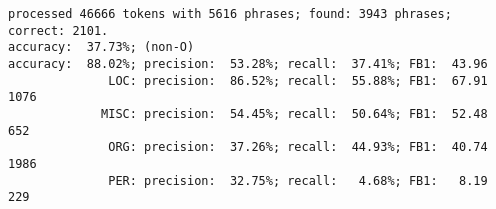 \documentclass[10pt]{article}
\begin{document}
\begingroup
    \fontsize{8pt}{12pt}\selectfont
    \begin{verbatim}  
processed 46666 tokens with 5616 phrases; found: 3943 phrases; correct: 2101.
accuracy:  37.73%; (non-O)
accuracy:  88.02%; precision:  53.28%; recall:  37.41%; FB1:  43.96
              LOC: precision:  86.52%; recall:  55.88%; FB1:  67.91  1076
             MISC: precision:  54.45%; recall:  50.64%; FB1:  52.48  652
              ORG: precision:  37.26%; recall:  44.93%; FB1:  40.74  1986
              PER: precision:  32.75%; recall:   4.68%; FB1:   8.19  229
\end{verbatim}


\endgroup
\end{document}
